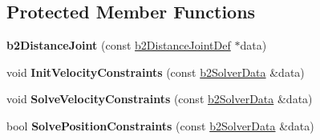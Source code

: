 \subsection*{Protected Member Functions}
\begin{DoxyCompactItemize}
\item 
{\bfseries b2\+Distance\+Joint} (const \hyperlink{structb2_distance_joint_def}{b2\+Distance\+Joint\+Def} $\ast$data)\hypertarget{classb2_distance_joint_ad2bb6de92a47868629a7397e23256454}{}\label{classb2_distance_joint_ad2bb6de92a47868629a7397e23256454}

\item 
void {\bfseries Init\+Velocity\+Constraints} (const \hyperlink{structb2_solver_data}{b2\+Solver\+Data} \&data)\hypertarget{classb2_distance_joint_a2062ea8f1c89f8ccc3f053bbc7211b12}{}\label{classb2_distance_joint_a2062ea8f1c89f8ccc3f053bbc7211b12}

\item 
void {\bfseries Solve\+Velocity\+Constraints} (const \hyperlink{structb2_solver_data}{b2\+Solver\+Data} \&data)\hypertarget{classb2_distance_joint_acbed5cd22ea4ccb44e4defe5f5aabe77}{}\label{classb2_distance_joint_acbed5cd22ea4ccb44e4defe5f5aabe77}

\item 
bool {\bfseries Solve\+Position\+Constraints} (const \hyperlink{structb2_solver_data}{b2\+Solver\+Data} \&data)\hypertarget{classb2_distance_joint_a1e8b3a477067cf9273fb78fbec1a1556}{}\label{classb2_distance_joint_a1e8b3a477067cf9273fb78fbec1a1556}

\end{DoxyCompactItemize}
